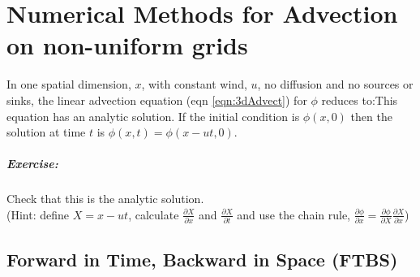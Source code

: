 
\chapter{Numerical Methods for Advection on non-uniform grids\label{chap:advect}}

In one spatial dimension, $x$, with constant wind, $u$, no diffusion
and no sources or sinks, the linear advection equation (eqn \ref{eqn:3dAdvect})
for $\phi$ reduces to:This equation has an analytic solution. If the initial condition
is $\phi(x,0)$ then the solution at time $t$ is $\phi(x,t)=\phi(x-ut,0)$.


\paragraph*{Exercise:}

Check that this is the analytic solution.\\
 (Hint: define $X=x-ut$, calculate $\frac{\partial X}{\partial x}$
and $\frac{\partial X}{\partial t}$ and use the chain rule, $\frac{\partial\phi}{\partial x}=\frac{\partial\phi}{\partial X}\frac{\partial X}{\partial x}$)\\

\clearpage{}


\section{Forward in Time, Backward in Space (FTBS)}


